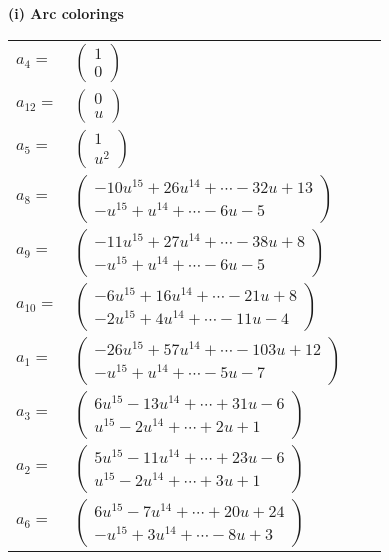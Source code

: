 \documentclass[1p]{elsarticle_modified}
\theoremstyle{definition}
\begin{document}
\flushleft \textbf{(i) Arc colorings}\\
\begin{tabular}{m{7pt} m{180pt} m{7pt} m{180pt} }
\flushright $a_{4}=$&$\begin{pmatrix}1\\0\end{pmatrix}$ \\
\flushright $a_{12}=$&$\begin{pmatrix}0\\u\end{pmatrix}$ \\
\flushright $a_{5}=$&$\begin{pmatrix}1\\u^2\end{pmatrix}$ \\
\flushright $a_{8}=$&$\begin{pmatrix}-10 u^{15}+26 u^{14}+\cdots-32 u+13\\- u^{15}+u^{14}+\cdots-6 u-5\end{pmatrix}$ \\
\flushright $a_{9}=$&$\begin{pmatrix}-11 u^{15}+27 u^{14}+\cdots-38 u+8\\- u^{15}+u^{14}+\cdots-6 u-5\end{pmatrix}$ \\
\flushright $a_{10}=$&$\begin{pmatrix}-6 u^{15}+16 u^{14}+\cdots-21 u+8\\-2 u^{15}+4 u^{14}+\cdots-11 u-4\end{pmatrix}$ \\
\flushright $a_{1}=$&$\begin{pmatrix}-26 u^{15}+57 u^{14}+\cdots-103 u+12\\- u^{15}+u^{14}+\cdots-5 u-7\end{pmatrix}$ \\
\flushright $a_{3}=$&$\begin{pmatrix}6 u^{15}-13 u^{14}+\cdots+31 u-6\\u^{15}-2 u^{14}+\cdots+2 u+1\end{pmatrix}$ \\
\flushright $a_{2}=$&$\begin{pmatrix}5 u^{15}-11 u^{14}+\cdots+23 u-6\\u^{15}-2 u^{14}+\cdots+3 u+1\end{pmatrix}$ \\
\flushright $a_{6}=$&$\begin{pmatrix}6 u^{15}-7 u^{14}+\cdots+20 u+24\\- u^{15}+3 u^{14}+\cdots-8 u+3\end{pmatrix}$ \\

\end{tabular}
\end{document}

